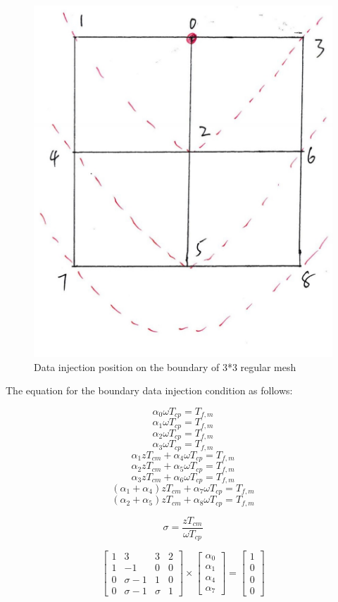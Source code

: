 \begin{figure}[h]
\centering\includegraphics[width= 0.7 \linewidth]{figure/e33_f}
\caption{Data injection position on the boundary of 3*3 regular mesh}
\label{e33f}
\end{figure}

The equation for the boundary data injection condition as follows:

$$\alpha_{0} \omega T_{cp} = T_{f,m}$$ 
$$\alpha_{1} \omega T_{cp} = T_{f,m}$$
$$\alpha_{2} \omega T_{cp} = T_{f,m}$$
$$\alpha_{3} \omega T_{cp} = T_{f,m}$$
$$\alpha_{1}zT_{cm} + \alpha_{4}\omega T_{cp} = T_{f,m}$$
$$\alpha_{2}zT_{cm} + \alpha_{5}\omega T_{cp} = T_{f,m}$$
$$\alpha_{3}zT_{cm} + \alpha_{6}\omega T_{cp} = T_{f,m}$$
$$(\alpha_{1} + \alpha_{4})zT_{cm} + \alpha_{7}\omega T_{cp} = T_{f,m}$$
$$(\alpha_{2} + \alpha_{5})zT_{cm} + \alpha_{8}\omega T_{cp} = T_{f,m}$$

$$\sigma = \frac{zT_{cm}}{\omega T_{cp}}$$

\vspace*{50pt}

\begin{equation}
{
\left[ \begin{array}{cccc}
1 & 3 & 3 & 2\\
1 & -1 & 0 & 0\\
0 & \sigma-1 & 1 & 0\\
0 & \sigma-1 & \sigma & 1
\end{array} 
\right ]} \times \left[ \begin{array}{c}
\alpha_{0} \\
\alpha_{1} \\
\alpha_{4} \\
\alpha_{7}
\end{array} 
\right ] = \left[ \begin{array}{c}
1 \\
0 \\
0 \\
0
\end{array} 
\right ]
\end{equation}

